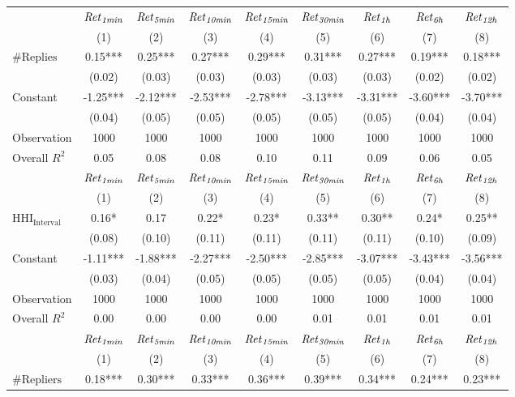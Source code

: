 \begin{tabular}{lcccccccc}
\hline
 & ${\it Ret}_{\it 1min}$ & ${\it Ret}_{\it 5min}$ & ${\it Ret}_{\it 10min}$ & ${\it Ret}_{\it 15min}$ & ${\it Ret}_{\it 30min}$ & ${\it Ret}_{\it 1h}$ & ${\it Ret}_{\it 6h}$ & ${\it Ret}_{\it 12h}$ \\
 & (1) & (2) & (3) & (4) & (5) & (6) & (7) & (8) \\
\hline
$\mathrm{\#Replies}$ & 0.15*** & 0.25*** & 0.27*** & 0.29*** & 0.31*** & 0.27*** & 0.19*** & 0.18*** \\
 & (0.02) & (0.03) & (0.03) & (0.03) & (0.03) & (0.03) & (0.02) & (0.02) \\
Constant & -1.25*** & -2.12*** & -2.53*** & -2.78*** & -3.13*** & -3.31*** & -3.60*** & -3.70*** \\
 & (0.04) & (0.05) & (0.05) & (0.05) & (0.05) & (0.05) & (0.04) & (0.04) \\
Observation & 1000 & 1000 & 1000 & 1000 & 1000 & 1000 & 1000 & 1000 \\
Overall $R^2$ & 0.05 & 0.08 & 0.08 & 0.10 & 0.11 & 0.09 & 0.06 & 0.05 \\
\hline
 & ${\it Ret}_{\it 1min}$ & ${\it Ret}_{\it 5min}$ & ${\it Ret}_{\it 10min}$ & ${\it Ret}_{\it 15min}$ & ${\it Ret}_{\it 30min}$ & ${\it Ret}_{\it 1h}$ & ${\it Ret}_{\it 6h}$ & ${\it Ret}_{\it 12h}$ \\
 & (1) & (2) & (3) & (4) & (5) & (6) & (7) & (8) \\
\hline
$\mathrm{HHI_\mathrm{Interval}}$ & 0.16* & 0.17 & 0.22* & 0.23* & 0.33** & 0.30** & 0.24* & 0.25** \\
 & (0.08) & (0.10) & (0.11) & (0.11) & (0.11) & (0.11) & (0.10) & (0.09) \\
Constant & -1.11*** & -1.88*** & -2.27*** & -2.50*** & -2.85*** & -3.07*** & -3.43*** & -3.56*** \\
 & (0.03) & (0.04) & (0.05) & (0.05) & (0.05) & (0.05) & (0.04) & (0.04) \\
Observation & 1000 & 1000 & 1000 & 1000 & 1000 & 1000 & 1000 & 1000 \\
Overall $R^2$ & 0.00 & 0.00 & 0.00 & 0.00 & 0.01 & 0.01 & 0.01 & 0.01 \\
\hline
 & ${\it Ret}_{\it 1min}$ & ${\it Ret}_{\it 5min}$ & ${\it Ret}_{\it 10min}$ & ${\it Ret}_{\it 15min}$ & ${\it Ret}_{\it 30min}$ & ${\it Ret}_{\it 1h}$ & ${\it Ret}_{\it 6h}$ & ${\it Ret}_{\it 12h}$ \\
 & (1) & (2) & (3) & (4) & (5) & (6) & (7) & (8) \\
\hline
$\mathrm{\#Repliers}$ & 0.18*** & 0.30*** & 0.33*** & 0.36*** & 0.39*** & 0.34*** & 0.24*** & 0.23*** \\

\end{tabular}

